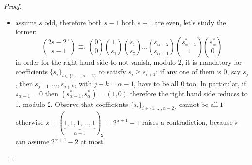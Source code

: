 \begin{proof}
\begin{itemize}
\begin{itemize}
            \item assume $s$ odd, therefore both $s-1$ both $s+1$ are even, 
                let's study the former:
                \begin{displaymath}
                        {{2s-2^{{\alpha}}}\choose{s-1}}  
                        \equiv_{2}
                        {{0}\choose{0}} 
                        {{1}\choose{s_{1}}}
                        {{s_{1}}\choose{s_{2}}}
                        \ldots
                        {{s_{{\alpha}-2}}\choose{s_{{\alpha}-1}}}
                        {{s_{{\alpha}-1}^{*}}\choose{1}}
                        {{s_{{\alpha}}^{*}}\choose{0}}
                \end{displaymath}
                in order for the right hand side to not vanish, modulo $2$,
                it is mandatory for coefficients $\lbrace s_{i}\rbrace_{i\in\lbrace1,\ldots,{\alpha}-2\rbrace}$
                to satisfy $s_{i}\geq s_{i+1}$: if any one of them is $0$, say $s_{j}$, then
                $s_{j+1},\ldots,s_{j+k}$, with $j+k={\alpha}-1$,
                have to be all $0$ too. In particular, if $s_{{\alpha}-1}=0$ then 
                $(s_{{\alpha}-1}^{*},s_{{\alpha}}^{*})=(1,0)$
                therefore the right hand side reduces to $1$, modulo $2$.
                Observe that coefficients $\lbrace s_{i}\rbrace_{i\in\lbrace1,\ldots,{\alpha}-2\rbrace}$
                cannot be all $1$ otherwise 
                $s=(\underbrace{1,1,1,\ldots,1}_{{\alpha}+1})_{2}=2^{{\alpha}+1}-1$ raises a contradiction, because
                $s$ can assume $2^{{\alpha}+1}-2$ at most. 
                

\end{itemize}
\end{itemize}
\end{proof}
